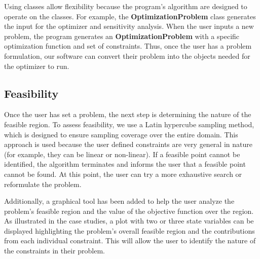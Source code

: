 \documentclass[10pt]{article}
\begin{document}
Using classes allow flexibility because the program's algorithm are designed to operate on the classes.  For example, the \textbf{OptimizationProblem} class generates the input for the optimizer and sensitivity analysis.  When the user inputs a new problem, the program generates an \textbf{OptimizationProblem} with a specific optimization function and set of constraints.  Thus, once the user has a problem formulation, our software can convert their problem into the objects needed for the optimizer to run.

\subsection{Feasibility}
\label{subsec:Feasibility}

Once the user has set a problem, the next step is determining the nature of the feasible region.  To assess feasibility, we use a Latin hypercube sampling method, which is designed to ensure sampling coverage over the entire domain.  This approach is used because the user defined constraints are very general in nature (for example, they can be linear or non-linear).  If a feasible point cannot be identified, the algorithm terminates and informs the user that a feasible point cannot be found.  At this point, the user can try a more exhaustive search or reformulate the problem.

Additionally, a graphical tool has been added to help the user analyze the problem's feasible region and the value of the objective function over the region.  As illustrated in the case studies, a plot with two or three state variables can be displayed highlighting the problem's overall feasible region and the contributions from each individual constraint.  This will allow the user to identify the nature of the constraints in their problem.
\end{document}
